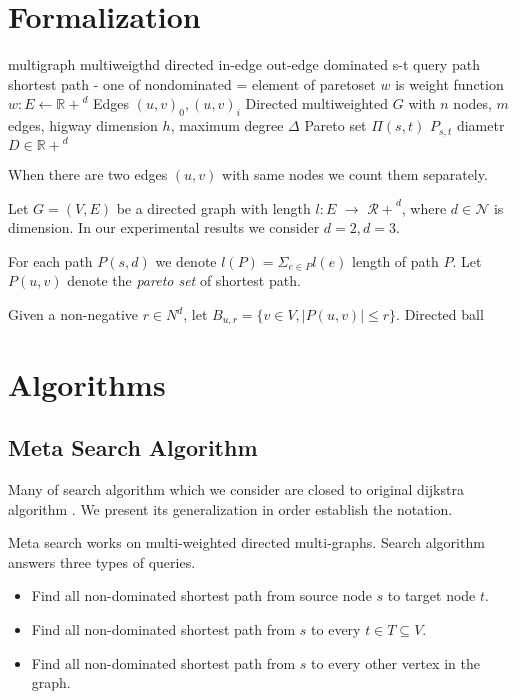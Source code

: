 
\section{Formalization}
multigraph 
multiweigthd
directed
in-edge out-edge
dominated
s-t query
path
shortest path - one of nondominated = element of paretoset
$w$ is weight function $w: E \leftarrow \mathbb{R+}^d$
Edges $(u,v)_0,(u,v)_i$
Directed multiweighted $G$ with
$n$ nodes,
$m$ edges, 
higway dimension $h$,
maximum degree $\Delta$
Pareto set $\Pi(s,t)$ $P_{s,t}$
diametr $D \in \mathbb{R+}^d$

When there are two edges $(u,v)$ with same nodes we count them
separately. 


Let $G = (V,E)$ be a directed graph with length
$l: E$ 
$ \rightarrow $
$\mathcal{R+}^d$, 
where $d \in \mathcal{N}$ is
dimension. In our experimental results
we consider $d=2, d=3$.

For each path $P(s,d)$ we denote 
$l(P) = \Sigma_{e\in P} l(e) $
length of path $P$.
Let $P(u,v)$ denote the \emph{pareto set} of shortest path.

Given a non-negative $r \in \mathcal{}{N}^d $, let $B_{u,r} = 
\{ v \in V, |P(u,v)| \le r \} $.
Directed ball


\section{Algorithms}

\subsection{Meta Search Algorithm}

Many of search algorithm which we consider
are closed to original dijkstra algorithm \cite{dijkstra1959note}.
We present its generalization in order establish the notation.

Meta search works on multi-weighted directed multi-graphs. 
Search algorithm answers three types of queries.
\begin{itemize}
\item Find all non-dominated shortest path from source node $s$ to target node $t$.
\item Find all non-dominated shortest path from $s$ to every $t \in T \subseteq V$.
\item Find all non-dominated shortest path from $s$ to every other vertex in the graph.
\end{itemize}

